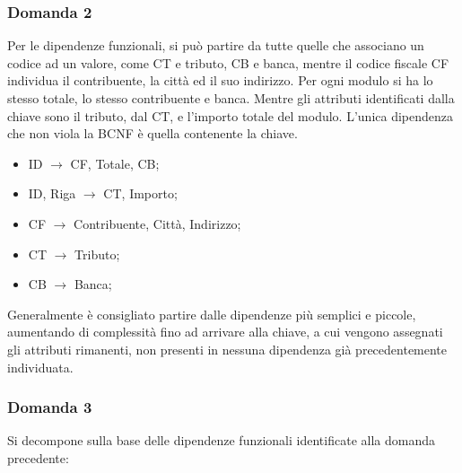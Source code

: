 \documentclass{article}
\begin{document}
\subsubsection*{Domanda 2}

Per le dipendenze funzionali, si può partire da tutte quelle che associano un codice ad un valore, come CT e tributo, CB e banca, mentre il codice fiscale CF individua il contribuente, la città ed il suo indirizzo. Per ogni modulo si ha lo stesso totale, lo stesso contribuente e banca. 
Mentre gli attributi identificati dalla chiave sono il tributo, dal CT, e l'importo totale del modulo. L'unica dipendenza che non viola la BCNF è quella contenente la chiave. 

\begin{itemize}
    \item ID $\to$ CF, Totale, CB;
    \item ID, Riga $\to$ CT, Importo;
    \item CF $\to$ Contribuente, Città, Indirizzo;
    \item CT $\to$ Tributo;
    \item CB $\to$ Banca;
\end{itemize}

Generalmente è consigliato partire dalle dipendenze più semplici e piccole, aumentando di complessità fino ad arrivare alla chiave, a cui vengono assegnati gli attributi rimanenti, non presenti in nessuna dipendenza già precedentemente individuata. 

\subsubsection*{Domanda 3}

Si decompone sulla base delle dipendenze funzionali identificate alla domanda precedente:
\end{document}
